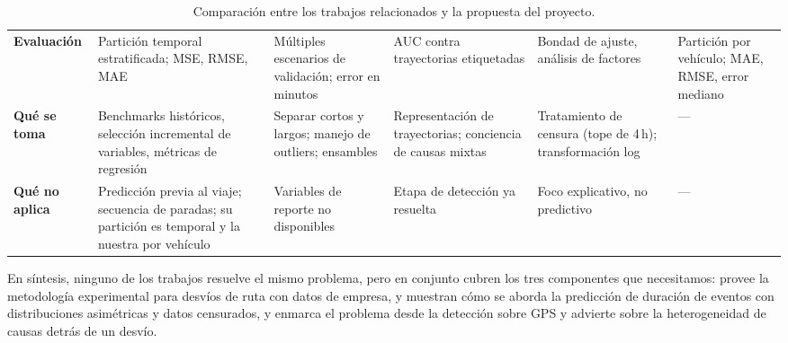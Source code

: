 \documentclass[12pt, a4paper]{article}
\begin{document}
\begin{landscape}
\begin{table}[p]
\begin{tabularx}{\linewidth}{>{\raggedright\arraybackslash}p{2.3cm} Y Y Y Y Y}
    \textbf{Evaluación} & Partición temporal estratificada; MSE, RMSE, MAE & Múltiples escenarios de validación; error en minutos & AUC contra trayectorias etiquetadas & Bondad de ajuste, análisis de factores & Partición por vehículo; MAE, RMSE, error mediano \\
    \textbf{Qué se toma} & Benchmarks históricos, selección incremental de variables, métricas de regresión & Separar cortos y largos; manejo de outliers; ensambles & Representación de trayectorias; conciencia de causas mixtas & Tratamiento de censura (tope de 4\,h); transformación log & --- \\
    \textbf{Qué no aplica} & Predicción previa al viaje; secuencia de paradas; su partición es temporal y la nuestra por vehículo & Variables de reporte no disponibles & Etapa de detección ya resuelta & Foco explicativo, no predictivo & --- \\
    \bottomrule
  \end{tabularx}
  \caption{Comparación entre los trabajos relacionados y la propuesta del proyecto.}
  \label{tab:comparacion}
\end{table}
\end{landscape}

En síntesis, ninguno de los trabajos resuelve el mismo problema, pero en
conjunto cubren los tres componentes que necesitamos: \cite{konovalenko2026}
provee la metodología experimental para desvíos de ruta con datos de empresa,
\cite{grigorev2022} y \cite{hojati2013} muestran cómo se aborda la predicción
de duración de eventos con distribuciones asimétricas y datos censurados, y
\cite{chen2013} enmarca el problema desde la detección sobre GPS y advierte
sobre la heterogeneidad de causas detrás de un desvío.
\end{document}
